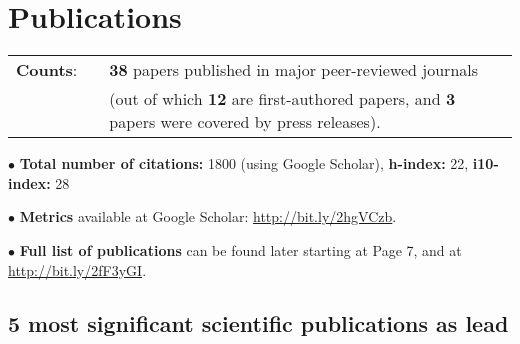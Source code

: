 \documentclass[11pt,letterpaper,sans]{moderncv}
\begin{document}
\section{Publications}

\cvitem{}
{
\begin{tabular}{rcl}
\textbf{Counts}: &\hspace{0.3cm} &{\textbf{38} papers published in major peer-reviewed journals} \\
& &{(out of which \textbf{12} are first-authored papers, and \textbf{3} papers were covered by press releases).}
\end{tabular}
}

$\bullet$ \textbf{Total number of citations:} 1800 (using Google Scholar), \textbf{h-index:} 22, \textbf{i10-index:} 28

$\bullet$ \textbf{Metrics} available at Google Scholar: {\color{color1} \href{http://bit.ly/2hgVCzb}{http://bit.ly/2hgVCzb}}.

$\bullet$ \textbf{Full list of publications} can be found later starting at Page 7, and at {\color{color1} \href{http://bit.ly/2fF3yGI}{http://bit.ly/2fF3yGI}}.

\subsection{5 most significant scientific publications as lead}
\end{document}
